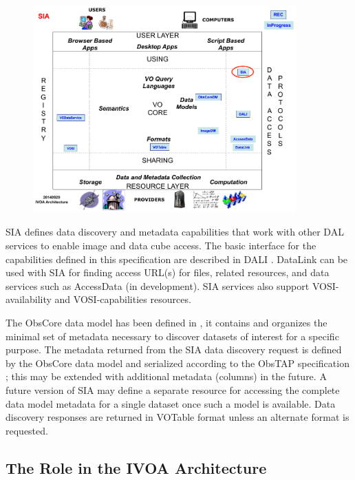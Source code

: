 \documentclass[11pt,a4paper]{ivoa}
\begin{document}
\begin{figure}[H]
\centering

\includegraphics[width=0.9\textwidth]{archdiag.png}
\label{fig:architecture}
\end{figure}

SIA defines data discovery and metadata capabilities that work with other DAL services to enable image and data cube access. The basic interface for the capabilities defined in this specification are described in DALI \citep{std:DALI}. DataLink can be used with SIA for finding access URL(s) for files, related resources, and data services such as AccessData (in development). SIA services also support VOSI-availability and VOSI-capabilities \citep{std:VOSI}  resources.

The ObsCore data model has been defined in \cite{std:OBSCORE}, it contains and organizes the minimal set of metadata necessary to discover datasets of interest for a specific purpose. The metadata returned from the SIA data discovery request is defined by the ObsCore data model and serialized according to the ObsTAP specification \citep{std:OBSCORE}; this may be extended with additional metadata (columns)  in the future.  A future version of SIA may define a separate resource for accessing the complete  data model metadata for a single dataset once such a model is available. Data discovery responses are returned in VOTable \citep{std:VOTABLE} format unless an alternate format is requested.

\subsection{The Role in the IVOA Architecture}
\end{document}
